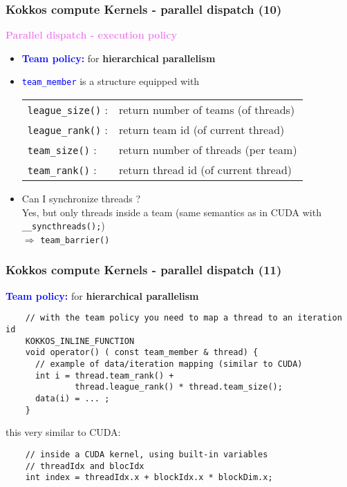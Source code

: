 \begin{frame}[fragile=singleslide]
  \frametitle{Kokkos compute Kernels - parallel dispatch (10)}

  {\Large \textcolor{violet}{\textbf{Parallel dispatch - execution policy}}}

  \begin{itemize}
  \item \textcolor{blue}{\bf Team policy:} for {\bf hierarchical parallelism}
  \item \textcolor{blue}{\texttt{team\_member}} is a structure equipped with
    \begin{tabular}{ll}
      \texttt{league\_size()} : & return number of teams (of threads)\\
      \texttt{league\_rank()} : & return team id (of current thread)\\
      \texttt{team\_size()}   : & return number of threads (per team)\\
      \texttt{team\_rank()} : & return thread id (of current thread)
    \end{tabular}
  \item Can I synchronize threads ?\\
    Yes, but only threads inside a team (same semantics as in CUDA with \texttt{\_\_syncthreads();})\\
    $\Rightarrow$ \texttt{team\_barrier()}

  \end{itemize}

\end{frame}

\begin{frame}[fragile=singleslide]
  \frametitle{Kokkos compute Kernels - parallel dispatch (11)}

  {\large \textcolor{blue}{\bf Team policy:} for {\bf hierarchical parallelism}}

  \begin{verbatim}
    // with the team policy you need to map a thread to an iteration id
    KOKKOS_INLINE_FUNCTION
    void operator() ( const team_member & thread) {
      // example of data/iteration mapping (similar to CUDA)
      int i = thread.team_rank() +
              thread.league_rank() * thread.team_size();
      data(i) = ... ;
    }
  \end{verbatim}
  this very similar to CUDA:
  \begin{verbatim}
    // inside a CUDA kernel, using built-in variables
    // threadIdx and blocIdx
    int index = threadIdx.x + blockIdx.x * blockDim.x;
  \end{verbatim}

\end{frame}

